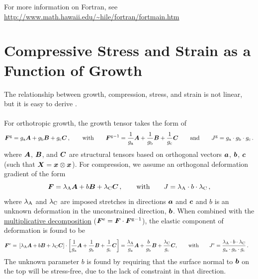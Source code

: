 \documentclass[10pt,letterpaper,oneside]{report}
\newcommand{\ten}[1]{\mbox{\boldmath $#1$}{}}
\newcommand{\scas}[1]{\mbox{{\scriptsize{${\rm{#1}}$}}}{}}
\begin{document}
For more information on Fortran, see \url{http://www.math.hawaii.edu/~hile/fortran/fortmain.htm}



\chapter{Compressive Stress and Strain as a Function of Growth}

The relationship between growth, compression, stress, and strain is not linear, but it is easy to derive \cite{Holland2017}. 
\\ \\ \noindent 
For orthotropic growth, the growth tensor takes the form of 
\begin{equation}
\ten{F}^{\scas{g}} = g_{\scas{a}} \ten{A} + g_{\scas{b}} \ten{B} + g_{\scas{c}} \ten{C} \, , 
\qquad \mbox{with} \qquad 
\ten{F}^{\scas{g}-1} = \frac{1}{g_{\scas{a}}} \ten{A} + \frac{1}{g_{\scas{b}}} \ten{B} + \frac{1}{g_{\scas{c}}} \ten{C} 
\qquad \mbox{and} \qquad 
J^{\scas{g}} = g_{\scas{a}} \cdot g_{\scas{b}} \cdot g_{\scas{c}} \, .
\end{equation}
where $\ten{A}$, $\ten{B}$, and $\ten{C}$ are structural tensors based on orthogonal vectors $\ten{a}$, $\ten{b}$, $\ten{c}$ (such that $\ten{X} = \ten{x} \otimes \ten{x}$).  
For compression, we assume an orthogonal deformation gradient of the form
\begin{equation}
\ten{F} = \lambda_{\scas{A}} \ten{A} + b \ten{B} + \lambda_{\scas{C}} \ten{C} \, , 
\qquad \mbox{with} \qquad 
J = \lambda_{\scas{A}} \cdot b \cdot \lambda_{\scas{C}} \, , 
\end{equation}
where $\lambda_{\scas{A}}$ and $\lambda_{\scas{C}}$ are imposed stretches in directions $\ten{a}$ and $\ten{c}$ and $b$ is an unknown deformation in the unconstrained direction, $\ten{b}$.  When combined with the \hyperlink{multiplicative}{multiplicative decomposition} ($ \ten{F}^{\scas{e}} = \ten{F} \cdot \ten{F}^{\scas{g}-1} $), the elastic component of deformation is found to be
\begin{align}
\ten{F}^{\scas{e}} ={}& \left[ \lambda_{\scas{A}} \ten{A} + b \ten{B} + \lambda_{\scas{C}} \ten{C} \right] \cdot \left[ \frac{1}{g_{\scas{a}}} \ten{A} + \frac{1}{g_{\scas{b}}} \ten{B} + \frac{1}{g_{\scas{c}}} \ten{C} \right] = \frac{\lambda_{\scas{A}} }{g_{\scas{a}}} \ten{A} + \frac{b}{g_{\scas{b}}} \ten{B} + \frac{\lambda_{\scas{C}} }{g_{\scas{c}}} \ten{C}
, 
\qquad \mbox{with} \qquad
J^{\scas{e}} = \frac{\lambda_{\scas{A}} \cdot b \cdot \lambda_{\scas{C}} }{g_{\scas{a}} \cdot g_{\scas{b}} \cdot g_{\scas{c}}} \, . 
\end{align}
The unknown parameter $b$ is found by requiring that the surface normal to $\ten{b}$ on the top will be stress-free, due to the lack of constraint in that direction.  
\end{document}
